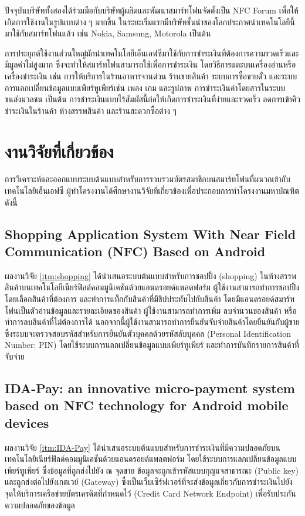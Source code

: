 \documentclass[a4paper]{article}
\begin{document}
ปัจจุบันบริษัททั้งสองได้ร่วมมือกับบริษัทผู้ผลิตและพัฒนาสมาร์ทโฟนจัดตั้งเป็น NFC Forum เพื่อให้เกิดการใช้งานในรูปแบบต่าง ๆ มากขึ้น ในระยะเริ่มแรกมีบริษัทชั้นนำของโลกประกาศนำเทคโนโลยีนี้มาใช้กับสมาร์ทโฟนแล้ว เช่น Nokia, Samsung, Motorola เป็นต้น

การประยุกต์ใช้งานส่วนใหญ่มักนำเทคโนโลยีเอ็นเอฟซีมาใช้กับการชำระเงินที่ต้องการความรวดเร็วและมีมูลค่าไม่สูงมาก ซึ่งจะทำให้สมาร์ทโฟนสามารถใช้เพื่อการชำระเงิน โดยวิธีการแตะบนเครื่องอ่านหรือเครื่องชำระเงิน เช่น การให้บริการในร้านอาหารจานด่วน ร้านขายสินค้า ระบบการซื้อขายตั๋ว และระบบการแลกเปลี่ยนข้อมูลแบบเพียร์ทูเพียร์เช่น เพลง เกม และรูปภาพ การชำระเงินค่าโดยสารในระบบขนส่งมวลชน เป็นต้น การชำระเงินแบบไร้สัมผัสนี้ก่อให้เกิดการชำระเงินที่ง่ายและรวดเร็ว ลดการเข้าคิวชำระเงินในร้านค้า ห้างสรรพสินค้า และร้านสะดวกซื้อต่าง ๆ


\section{งานวิจัยที่เกี่ยวข้อง}
การวิเคราะห์และออกแบบระบบต้นแบบสำหรับการรวบรวมบัตรสมาชิกบนสมาร์ทโฟนที่ผนวกเข้ากับเทคโนโลยีเอ็นเอฟซี ผู้ทำโครงงานได้ศึกษางานวิจัยที่เกี่ยวข้องเพื่อประกอบการทําโครงงานมหาบัณฑิต ดังนี้

\subsection{Shopping Application System With Near Field Communication (NFC) Based on Android}
ผลงานวิจัย \ref{itm:shopping}  ได้นำเสนอระบบต้นแบบสำหรับการชอปปิ้ง (shopping) ในห้างสรรพสินค้าบนเทคโนโลยีเนียร์ฟิลด์คอมมูนิเคชันด้วยแอนดรอยด์แพลตฟอร์ม ผู้ใช้งานสามารถทำการชอปปิ้งโดยเลือกสินค้าที่ต้องการ และทำการแท็กกับสินค้าที่มีชิปประทับไปกับสินค้า โดยมีแอนดรอยด์สมาร์ทโฟนเป็นตัวอ่านข้อมูลและรายละเอียดของสินค้า ผู้ใช้งานสามารถทำการเพิ่ม ลบจำนวนของสินค้า หรือทำการลบสินค้าที่ไม่ต้องการได้ นอกจากนี้ผู้ใช้งานสามารถทำการยืนยันจับจ่ายสินค้าโดยยืนยันกับผู้ขายซึ่งระบบจะตรวจสอบรหัสสำหรับการยืนยันตัวบุคคลด้วยรหัสลับบุคคล (Personal Identification Number: PIN) โดยใช้ระบบการแลกเปลี่ยนข้อมูลแบบเพียร์ทูเพียร์ และทำการบันทึกรายการสินค้าที่จับจ่าย

\subsection{IDA-Pay: an innovative micro-payment system based on NFC technology for Android mobile devices}
ผลงานวิจัย \ref{itm:IDA-Pay} ได้นำเสนอระบบต้นแบบสำหรับการชำระเงินที่มีความปลอดภัยบนเทคโนโลยีเนียร์ฟิลด์คอมมูนิเคชันด้วยแอนดรอยด์แพลตฟอร์ม โดยใช้ระบบการแลกเปลี่ยนข้อมูลแบบเพียร์ทูเพียร์ ซึ่งข้อมูลที่ถูกส่งไปยัง ณ จุดขาย ข้อมูลจะถูกเข้ารหัสแบบกุญแจสาธารณะ (Public key) และถูกส่งต่อไปยังเกตเวย์ (Gateway) ซึ่งเป็นเว็บเซิร์ฟเวอร์ที่จะส่งข้อมูลเกี่ยวกับการชำระเงินไปยังจุดให้บริการเครือข่ายบัตรเครดิตที่กำหนดไว้ (Credit Card Network Endpoint) เพื่อรับประกันความปลอดภัยของข้อมูล
\end{document}
